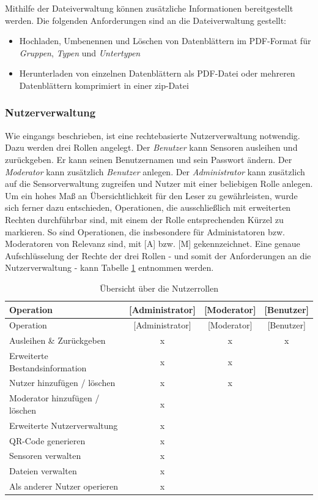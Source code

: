 \documentclass[
]{article}
\providecommand{\tightlist}{%
  \setlength{\itemsep}{0pt}\setlength{\parskip}{0pt}}
\begin{document}
Mithilfe der Dateiverwaltung können zusätzliche Informationen bereitgestellt werden. Die folgenden Anforderungen sind an die Dateiverwaltung gestellt:

\begin{itemize}
\tightlist
\item
  Hochladen, Umbenennen und Löschen von Datenblättern im PDF-Format für \emph{Gruppen}, \emph{Typen} und \emph{Untertypen}
\item
  Herunterladen von einzelnen Datenblättern als PDF-Datei oder mehreren Datenblättern komprimiert in einer zip-Datei
\end{itemize}

\hypertarget{nutzerverwaltung}{%
\subsubsection{Nutzerverwaltung}\label{nutzerverwaltung}}

Wie eingangs beschrieben, ist eine rechtebasierte Nutzerverwaltung notwendig. Dazu werden drei Rollen angelegt. Der \emph{Benutzer} kann Sensoren ausleihen und zurückgeben. Er kann seinen Benutzernamen und sein Passwort ändern. Der \emph{Moderator} kann zusätzlich \emph{Benutzer} anlegen. Der \emph{Administrator} kann zusätzlich auf die Sensorverwaltung zugreifen und Nutzer mit einer beliebigen Rolle anlegen. Um ein hohes Maß an Übersichtlichkeit für den Leser zu gewährleisten, wurde sich ferner dazu entschieden, Operationen, die ausschließlich mit erweiterten Rechten durchführbar sind, mit einem der Rolle entsprechenden Kürzel zu markieren. So sind Operationen, die insbesondere für Administatoren bzw. Moderatoren von Relevanz sind, mit {[}A{]} bzw. {[}M{]} gekennzeichnet. Eine genaue Aufschlüsselung der Rechte der drei Rollen - und somit der Anforderungen an die Nutzerverwaltung - kann Tabelle \ref{tab:user-rights} entnommen werden.

\begin{longtable}[]{@{}lccc@{}}
\caption{\label{tab:user-rights} Übersicht über die Nutzerrollen}\tabularnewline
\toprule
Operation & {[}Administrator{]} & {[}Moderator{]} & {[}Benutzer{]} \\
\midrule
\endfirsthead
\toprule
Operation & {[}Administrator{]} & {[}Moderator{]} & {[}Benutzer{]} \\
\midrule
\endhead
Ausleihen \& Zurückgeben & x & x & x \\
Erweiterte Bestandsinformation & x & x & \\
Nutzer hinzufügen / löschen & x & x & \\
Moderator hinzufügen / löschen & x & & \\
Erweiterte Nutzerverwaltung & x & & \\
QR-Code generieren & x & & \\
Sensoren verwalten & x & & \\
Dateien verwalten & x & & \\
Als anderer Nutzer operieren & x & & \\
\bottomrule
\end{longtable}
\end{document}
